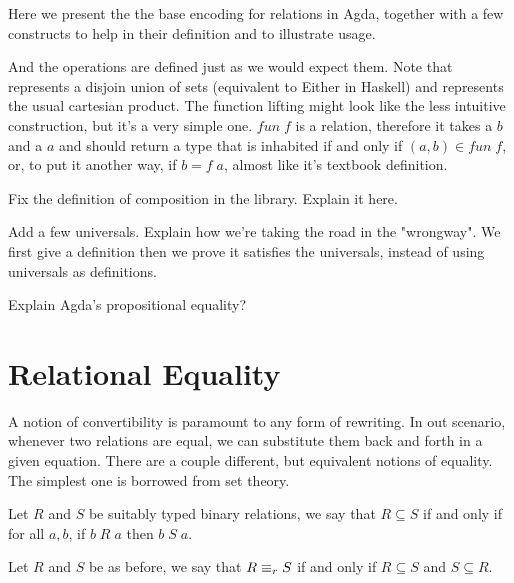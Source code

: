Here we present the the base encoding for relations in Agda, together with a few constructs
to help in their definition and to illustrate usage.


And the operations are defined just as we would expect them. Note that  represents a disjoin union of sets
(equivalent to Either in Haskell) and  represents the usual cartesian product. The function
lifting might look like the less intuitive construction, but it's a very simple one. $fun\;f$ is a relation,
therefore it takes a $b$ and a $a$ and should return a type that is inhabited if and only if $(a, b) \in fun\;f$,
or, to put it another way, if $b = f\;a$, almost like it's textbook definition.

\begin{TODO}
  \item Fix the definition of composition in the library. Explain it here.
  \item Add a few universals. Explain how we're taking the road in the "wrongway".
        We first give a definition then we prove it satisfies the universals, instead
        of using universals as definitions.
  \item Explain Agda's propositional equality?
\end{TODO}

\section{Relational Equality}

A notion of convertibility is paramount to any form of rewriting. In out scenario, whenever
two relations are equal, we can substitute them back and forth in a given equation. There are
a couple different, but equivalent notions of equality. The simplest one is borrowed from set
theory.\\

\begin{mydef}
Let $R$ and $S$ be suitably typed binary relations, we say that $R \subseteq S$ 
if and only if for all $a , b$, if $b\;R\;a$ then $b\;S\;a$.\\
\end{mydef}

\begin{mydef}
Let $R$ and $S$ be as before, we say that $R \equiv_r S$ if and only if
$R \subseteq S$ and $S \subseteq R$.\\
\end{mydef}

